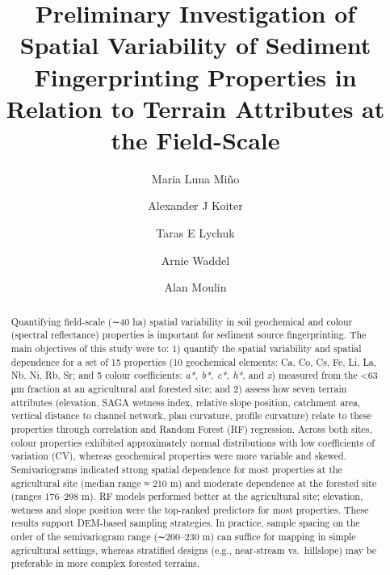 \documentclass[
  number]{elsarticle}
\begin{document}
\begin{frontmatter}
\title{Preliminary Investigation of Spatial Variability of Sediment
Fingerprinting Properties in Relation to Terrain Attributes at the
Field-Scale}
\author[1]{Maria Luna Miño%
%
}
\author[2]{Alexander J Koiter%
%
}
\author[3]{Taras E Lychuk%
%
}
\author[3]{Arnie Waddel%
%
}
\author[3]{Alan Moulin%
%
}







        
\begin{abstract}
Quantifying field-scale (∼40 ha) spatial variability in soil geochemical
and colour (spectral reflectance) properties is important for sediment
source fingerprinting. The main objectives of this study were to: 1)
quantify the spatial variability and spatial dependence for a set of 15
properties (10 geochemical elements: Ca, Co, Cs, Fe, Li, La, Nb, Ni, Rb,
Sr; and 5 colour coefficients: \emph{a*, b*, c*, h*}, and \emph{x})
measured from the \textless63 μm fraction at an agricultural and
forested site; and 2) assess how seven terrain attributes (elevation,
SAGA wetness index, relative slope position, catchment area, vertical
distance to channel network, plan curvature, profile curvature) relate
to these properties through correlation and Random Forest (RF)
regression. Across both sites, colour properties exhibited approximately
normal distributions with low coefficients of variation (CV), whereas
geochemical properties were more variable and skewed. Semivariograms
indicated strong spatial dependence for most properties at the
agricultural site (median range ≈ 210 m) and moderate dependence at the
forested site (ranges 176--298 m). RF models performed better at the
agricultural site; elevation, wetness and slope position were the
top-ranked predictors for most properties. These results support
DEM-based sampling strategies. In practice, sample spacing on the order
of the semivariogram range (∼200--230 m) can suffice for mapping in
simple agricultural settings, whereas stratified designs (e.g.,
near-stream vs.~hillslope) may be preferable in more complex forested
terrains.
\end{abstract}






\end{frontmatter}
\end{document}

